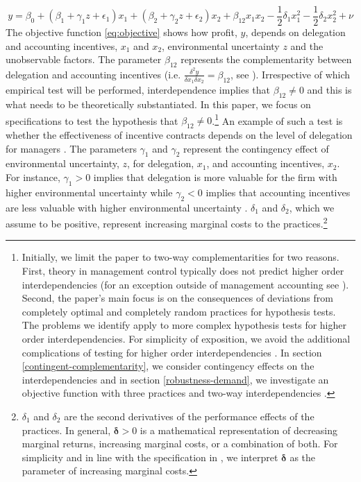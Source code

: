 \documentclass[12pt]{article}
\begin{document}
\begin{equation}\label{eq:objective}
y  = \beta_0 + (\beta_{1} + \gamma_1 z + \epsilon_1) x_1 
						+ (\beta_{2} + \gamma_2 z  + \epsilon_2) x_2 
                        + \beta_{12} x_1 x_2 - \frac{1}{2}\delta_1 x^2_1 - \frac{1}{2}\delta_2 x^2_2 + \nu
\end{equation}
The objective function \eqref{eq:objective} shows how profit, $y$, depends on delegation and accounting incentives, $x_1$ and $x_2$, environmental uncertainty $z$ and the unobservable factors. The parameter $\beta_{12}$ represents the complementarity between delegation and accounting incentives (i.e. $\frac{\delta^2 y}{\delta x_1 \delta x_2} = \beta_{12}$, see \citet{grabner_management_2013}). Irrespective of which empirical test will be performed, interdependence implies that $\beta_{12}\neq0$ and this is what needs to be theoretically substantiated. In this paper, we focus on specifications to test the hypothesis that $\beta_{12} \neq 0$.\footnote{Initially, we limit the paper to two-way complementarities for two reasons. First, theory in management control typically does not predict higher order interdependencies (for an exception outside of management accounting see \citet{aral_three-way_2012}). Second, the paper's main focus is on the consequences of deviations from completely optimal and completely random practices for hypothesis tests. The problems we identify apply to more complex hypothesis tests for higher order interdependencies. For simplicity of exposition, we avoid the additional complications of testing for higher order interdependencies \citep{carree_note_2011}. In section \ref{contingent-complementarity}, we consider contingency effects on the interdependencies \citep{grabner_incentive_2014, grabner_cost_2016, matejka_balancing_2017} and in section \ref{robustness-demand}, we investigate an objective function with three practices and two-way interdependencies \citep{indjejikian_accounting_2012}.}
An example of such a test is whether the effectiveness of incentive contracts depends on the level of delegation for managers \citep{moers_performance_2006, indjejikian_accounting_2012}. The parameters $\gamma_1$ and $\gamma_2$ represent the contingency effect of environmental uncertainty, $z$, for delegation, $x_1$, and accounting incentives, $x_2$. For instance, $\gamma_1 > 0$ implies that delegation is more valuable for the firm with higher environmental uncertainty while $\gamma_2 < 0$ implies that accounting incentives are less valuable with higher environmental uncertainty \citep{chenhall_management_2003}. 
$\delta_1$ and $\delta_2$, which we assume to be positive, represent increasing marginal costs to the practices.\footnote{$\delta_{1}$ and $\delta_{2}$ are the second derivatives of the performance effects of the practices. In general, $\mathbf{\delta} > 0$ is a mathematical representation of decreasing marginal returns,  increasing marginal  costs, or a combination of both. For simplicity and in line with the specification in \citet{grabner_management_2013}, we interpret $\mathbf{\delta}$ as the parameter of  increasing marginal costs.} 
\end{document}
